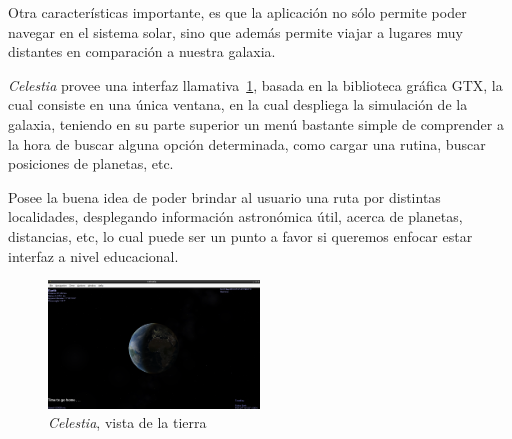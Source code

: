 Otra características importante, es que la aplicación
no sólo permite poder navegar en el sistema solar,
sino que además permite viajar a lugares
muy distantes en comparación a nuestra galaxia.

\emph{Celestia} provee una interfaz llamativa~\ref{fig:celestia},
basada en la biblioteca gráfica GTX, la cual consiste en una única ventana,
en la cual despliega la simulación de la galaxia,
teniendo en su parte superior un menú bastante simple de comprender
a la hora de buscar alguna opción determinada,
como cargar una rutina, buscar posiciones de planetas, etc.

Posee la buena idea de poder
brindar al usuario una ruta por distintas localidades,
desplegando información astronómica útil,
acerca de planetas, distancias, etc,
lo cual puede ser un punto a favor si queremos
enfocar estar interfaz a nivel educacional.

\begin{figure}[!htb]
    \centering
    \includegraphics[width=0.5\textwidth]{img/celestia}
    \caption{\emph{Celestia}, vista de la tierra}
    \label{fig:celestia}
\end{figure}
